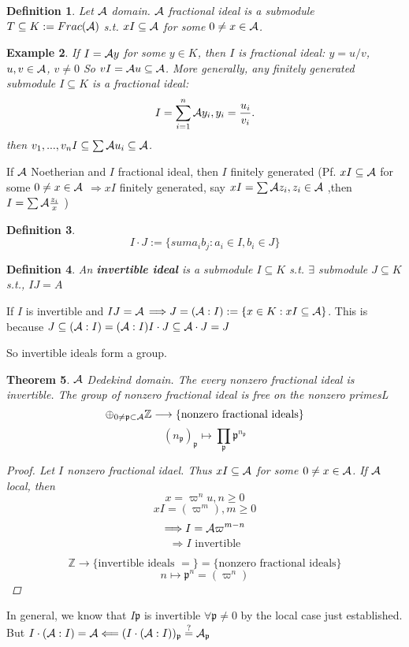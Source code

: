 \documentclass[11pt]{article}
\newtheorem{thm}{Theorem}[section]
\newtheorem{dfn}[thm]{Definition}
\newtheorem{ex}[thm]{Example}
\newcommand{\intg}{\mathbb Z}
\newcommand{\scp}{{\mathfrak p}}
\newcommand{\cala}{{\cal A}}
\newcommand{\Lrta}{\Longrightarrow}
\newcommand{\lrta}{\longrightarrow}
\newcommand{\Llta}{\Longleftarrow}
\begin{document}
\begin{dfn}
Let $\cala$ domain. $\cala$ fractional ideal is a submodule $T\subseteq K:=Frac(\cala)$ s.t. $x I\subseteq \cala$ for some $0\neq x\in\cala$.
\end{dfn}
\begin{ex}
If $I=\cala y$ for some $y\in K$, then $I$ is fractional ideal: $y=u/v$, $u,v\in\cala$, $v\neq 0$
So $v I=\cala u\subseteq \cala$. More generally, any finitely generated submodule $I\subseteq K$ is a fractional ideal:
$$
I=\sum_{i=1}^n\cala y_i, y_i=\frac{u_i}{v_i}.
$$
then $v_1,...,v_n I\subseteq \sum\cala u_i\subseteq \cala$.
\end{ex}
If $\cala$ Noetherian and $I$ fractional ideal, then $I $ finitely generated 
(Pf. $x I\subseteq \cala$ for some $0\neq x\in \cala$ $\Lrta xI$ finitely generated, say $xI =\sum\cala z_i,z_i\in \cala$ ,then $I=\sum\cala \frac{z_i}{x}$
)

\begin{dfn}
$$
I\cdot J:=\{sum a_i b_j: a_i \in I, b_i\in J\}
$$
\end{dfn}

\begin{dfn}
An \textbf{invertible ideal} is a submodule $I\subseteq K$ s.t. $\exists$ submodule $J\subseteq K$ s.t., $IJ=A$
\end{dfn}

If $I$ is invertible and $IJ=\cala$ $\Lrta J=(\cala: I):=\{x\in K: xI \subseteq \cala\}$. This is because 
$J\subseteq (\cala:I)=(\cala:I) I\cdot J\subseteq \cala\cdot J=J$

So invertible ideals form a group.
\begin{thm}
$\cala$ Dedekind domain. The every nonzero fractional ideal is invertible. The group of nonzero fractional ideal is free on the nonzero primesL
$$
\oplus_{0\neq \scp\subset\cala}\intg\lrta \{\text{nonzero fractional ideals}\}
$$
$$
(n_\scp)_\scp\longmapsto \prod_\scp\scp^{n_\scp}
$$
\begin{proof}
Let $I$ nonzero fractional idael. Thus $xI \subseteq\cala$ for some $0\neq x\in \cala$. If $\cala$ local, then
$$
x=\varpi^nu,n\geq 0
$$
$$
xI=(\varpi^m),m\geq 0
$$
$$
\Lrta I=\cala\varpi^{m-n}
$$
$$
\Lrta I\text{ invertible}
$$

$$
\intg\lrta \{\text{invertible ideals }=\}=\{\text{nonzero fractional ideals}\}
$$
$$
n\longmapsto \scp^n=(\varpi^n)
$$
\end{proof}
\end{thm}

In general, we know that $I\scp$ is invertible $\forall \scp\neq 0$ by the local case just established. But $I\cdot(\cala:I)=\cala\Llta (I\cdot (\cala:I))_\scp\overset{?}{=}\cala_\scp$
\end{document}
